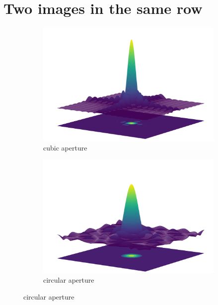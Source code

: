 \section{Two images in the same row}
\begin{figure}[htbp!]
	\begin{subfigure}{0.5\linewidth}
		\includegraphics[width = \textwidth]{Ch2_Images/Cubic_aperture.png}
		\caption{cubic aperture}
		\label{cubicAperture}
	\end{subfigure}
	\begin{subfigure}{0.5\linewidth}
		\includegraphics[width = \textwidth]{Ch2_Images/Circular_aperture.png}
		\caption{circular aperture}
		\label{circularAperture}
	\end{subfigure}
\end{figure}

